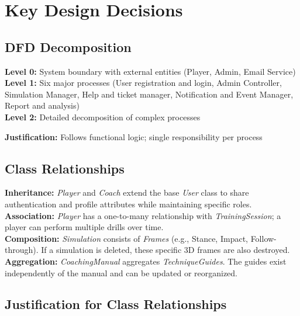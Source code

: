 \documentclass[12pt,a4paper]{article}
\begin{document}
\section{Key Design Decisions}

\subsection{DFD Decomposition}

\textbf{Level 0:} System boundary with external entities (Player, Admin, Email Service) \\
\textbf{Level 1:} Six major processes (User registration and login, Admin Controller, Simulation Manager, Help and ticket manager, Notification and Event Manager, Report and analysis) \\
\textbf{Level 2:} Detailed decomposition of complex processes

\textbf{Justification:} Follows functional logic; single responsibility per process

\subsection{Class Relationships}

\textbf{Inheritance:} \textit{Player} and \textit{Coach} extend the base \textit{User} class to share authentication and profile attributes while maintaining specific roles. \\

\textbf{Association:} \textit{Player} has a one-to-many relationship with \textit{TrainingSession}; a player can perform multiple drills over time. \\

\textbf{Composition:} \textit{Simulation} consists of \textit{Frames} (e.g., Stance, Impact, Follow-through). If a simulation is deleted, these specific 3D frames are also destroyed. \\

\textbf{Aggregation:} \textit{CoachingManual} aggregates \textit{TechniqueGuides}. The guides exist independently of the manual and can be updated or reorganized.

\subsection{Justification for Class Relationships}
\end{document}

